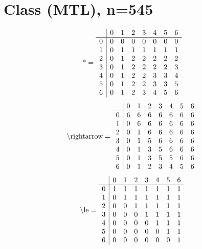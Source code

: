 \documentclass[11pt]{article}
\begin{document}
\section{Class (MTL), n=545}
\[\text{*} = 
\begin{array}{r | r r r r r r r}
 & 0 & 1 & 2 & 3 & 4 & 5 & 6 \\ \hline
0 & 0 & 0 & 0 & 0 & 0 & 0 & 0 \\
1 & 0 & 1 & 1 & 1 & 1 & 1 & 1 \\
2 & 0 & 1 & 2 & 2 & 2 & 2 & 2 \\
3 & 0 & 1 & 2 & 2 & 2 & 2 & 3 \\
4 & 0 & 1 & 2 & 2 & 3 & 3 & 4 \\
5 & 0 & 1 & 2 & 2 & 3 & 3 & 5 \\
6 & 0 & 1 & 2 & 3 & 4 & 5 & 6 \\
\end{array}
\]
\[\text{\textbackslash rightarrow} = 
\begin{array}{r | r r r r r r r}
 & 0 & 1 & 2 & 3 & 4 & 5 & 6 \\ \hline
0 & 6 & 6 & 6 & 6 & 6 & 6 & 6 \\
1 & 0 & 6 & 6 & 6 & 6 & 6 & 6 \\
2 & 0 & 1 & 6 & 6 & 6 & 6 & 6 \\
3 & 0 & 1 & 5 & 6 & 6 & 6 & 6 \\
4 & 0 & 1 & 3 & 5 & 6 & 6 & 6 \\
5 & 0 & 1 & 3 & 5 & 5 & 6 & 6 \\
6 & 0 & 1 & 2 & 3 & 4 & 5 & 6 \\
\end{array}
\]
\[\text{\textbackslash le} = 
\begin{array}{r | r r r r r r r}
 & 0 & 1 & 2 & 3 & 4 & 5 & 6 \\ \hline
0 & 1 & 1 & 1 & 1 & 1 & 1 & 1 \\
1 & 0 & 1 & 1 & 1 & 1 & 1 & 1 \\
2 & 0 & 0 & 1 & 1 & 1 & 1 & 1 \\
3 & 0 & 0 & 0 & 1 & 1 & 1 & 1 \\
4 & 0 & 0 & 0 & 0 & 1 & 1 & 1 \\
5 & 0 & 0 & 0 & 0 & 0 & 1 & 1 \\
6 & 0 & 0 & 0 & 0 & 0 & 0 & 1 \\
\end{array}
\]
\end{document}
